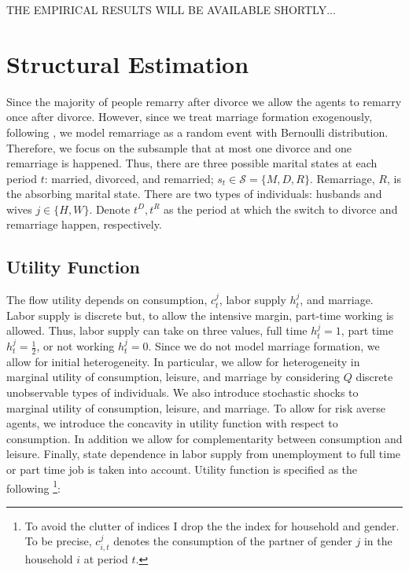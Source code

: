 THE EMPIRICAL RESULTS WILL BE AVAILABLE SHORTLY...



  

\section{Structural Estimation}

Since the majority of people remarry after divorce we allow the agents to remarry once after divorce. However, since we treat marriage formation exogenously,  following \citet{Voena_2015}, we model remarriage as a random event with Bernoulli distribution. Therefore, we focus on the subsample that at most one divorce and one remarriage is happened. Thus, there are three possible marital states at each period $t$: married, divorced, and remarried; $s_t \in \mathcal S = \{M, D, R \}$. Remarriage, $R$,  is the absorbing marital state.  There are two types of individuals: husbands and wives $j \in \{ H, W\}$. Denote $t^D, t^R$ as the period at which the switch to divorce and remarriage happen, respectively. \\


\subsection{Utility Function}
The flow utility depends on consumption, $c_t^j$, labor supply $h_t^j$, and marriage. Labor supply is discrete but, to allow the intensive margin, part-time working is allowed. Thus, labor supply can take on three values, full time $h_t^j = 1$,  part time $h_t^j = \frac{1}{2}$, or not working $h_t^j = 0$. Since we do not model marriage formation, we allow for initial heterogeneity. In particular, we allow for heterogeneity in marginal utility of consumption, leisure, and marriage by considering $Q$ discrete  unobservable types of individuals. We also introduce stochastic shocks to  marginal utility of consumption, leisure, and marriage. To allow for risk averse agents, we introduce the concavity in utility function with respect to consumption. In addition we allow for complementarity between consumption and leisure. Finally, state dependence in labor supply from unemployment to full time or part time job is taken into account.  Utility function is specified as the following \footnote {To avoid the clutter of indices I drop the the index for household and gender. To be precise, $c^j_{i,t}$ denotes the consumption of the partner of gender $j$ in the household $i$ at period $t$. }:
  
